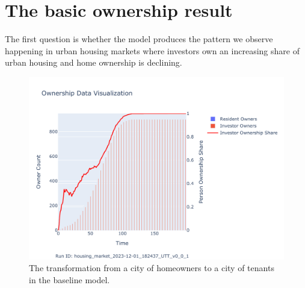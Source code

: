 



\section{The basic ownership result}









The first question is whether the model produces the pattern we observe happening in urban housing markets where investors own an increasing share of urban housing and home ownership is declining. %

\begin{figure}[h!tb]
    \centering
    \hspace{4cm} %
    \includegraphics[scale=0.8, trim={0 1cm 0 1.8cm}, clip]{fig/Analysis/Ownership_Data_1.pdf}
    \caption{The transformation from a city of homeowners to a city of tenants in the baseline model.}
    \label{fig:Baseline_ownership_trajectory}
\end{figure}


